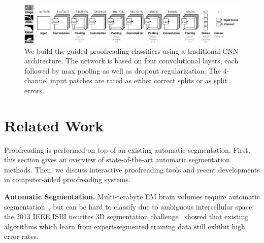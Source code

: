 \begin{figure}[t]
\begin{center}
\includegraphics[width=\linewidth]{gfx/architecture.png}
\end{center}
  \vspace{-4mm}
   \caption{We build the guided proofreading classifiers using a traditional CNN architecture. The network is based on four convolutional layers, each followed by max pooling as well as dropout regularization. The 4-channel input patches are rated as either correct splits or as split errors.}
\label{fig:architecture}
\end{figure}

\section{Related Work}

Proofreading is performed on top of an existing automatic segmentation. First, this section gives an overview of state-of-the-art automatic segmentation methods. Then, we discuss interactive proofreading tools and recent developments in computer-aided proofreading systems.

\textbf{Automatic Segmentation.} Multi-terabyte EM brain volumes require automatic segmentation~\cite{jain2010,Liu2014,NunezIglesias2013Machine,GALA2014}, but can be hard to classify due to ambiguous intercellular space: the 2013 IEEE ISBI neurites 3D segmentation challenge~\cite{isbi_challenge} showed that existing algorithms which learn from expert-segmented training data still exhibit high error rates.

